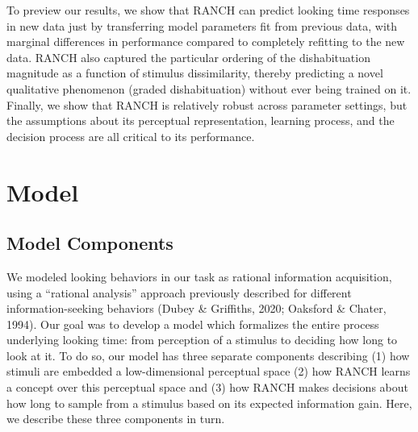 \documentclass[10pt, letterpaper]{article}
\begin{document}
To preview our results, we show that RANCH can predict looking time
responses in new data just by transferring model parameters fit from
previous data, with marginal differences in performance compared to
completely refitting to the new data. RANCH also captured the particular
ordering of the dishabituation magnitude as a function of stimulus
dissimilarity, thereby predicting a novel qualitative phenomenon (graded
dishabituation) without ever being trained on it. Finally, we show that
RANCH is relatively robust across parameter settings, but the
assumptions about its perceptual representation, learning process, and
the decision process are all critical to its performance.

\hypertarget{model}{%
\section{Model}\label{model}}

\hypertarget{model-components}{%
\subsection{Model Components}\label{model-components}}

We modeled looking behaviors in our task as rational information
acquisition, using a ``rational analysis'' approach previously described
for different information-seeking behaviors (Dubey \& Griffiths, 2020;
Oaksford \& Chater, 1994). Our goal was to develop a model which
formalizes the entire process underlying looking time: from perception
of a stimulus to deciding how long to look at it. To do so, our model
has three separate components describing (1) how stimuli are embedded a
low-dimensional perceptual space (2) how RANCH learns a concept over
this perceptual space and (3) how RANCH makes decisions about how long
to sample from a stimulus based on its expected information gain. Here,
we describe these three components in turn.
\end{document}
